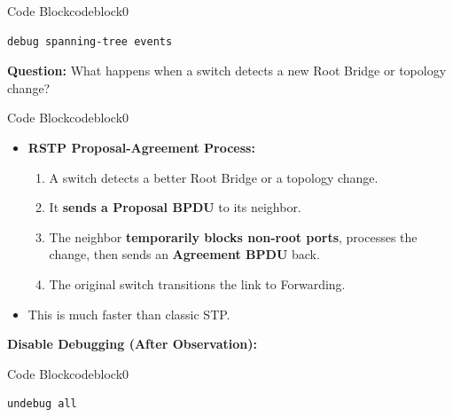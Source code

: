 \documentclass[a4paper]{book}
\begin{document}
\begin{enumerate}


	      \begin{ocg}{Code Block}{codeblock}{0}
		      \vspace{0.5cm}
		      \begin{lstlisting}
debug spanning-tree events
              \end{lstlisting}
	      \end{ocg}

	      \textbf{Question:} What happens when a switch detects a new Root Bridge or topology change?




	      \begin{ocg}{Code Block}{codeblock}{0}
		      \vspace{0.5cm}
		      \begin{itemize}
			      \item \textbf{RSTP Proposal-Agreement Process:}
			            \begin{enumerate}
				            \item A switch detects a better Root Bridge or a topology change.
				            \item It \textbf{sends a Proposal BPDU} to its neighbor.
				            \item The neighbor \textbf{temporarily blocks non-root ports}, processes the change, then sends an \textbf{Agreement BPDU} back.
				            \item The original switch transitions the link to Forwarding.
			            \end{enumerate}
			      \item This is much faster than classic STP.
		      \end{itemize}
	      \end{ocg}


	      \textbf{Disable Debugging (After Observation):}



	      \begin{ocg}{Code Block}{codeblock}{0}
		      \vspace{0.5cm}
		      \begin{lstlisting}
undebug all
              \end{lstlisting}
	      \end{ocg}



\end{enumerate}
\end{document}

